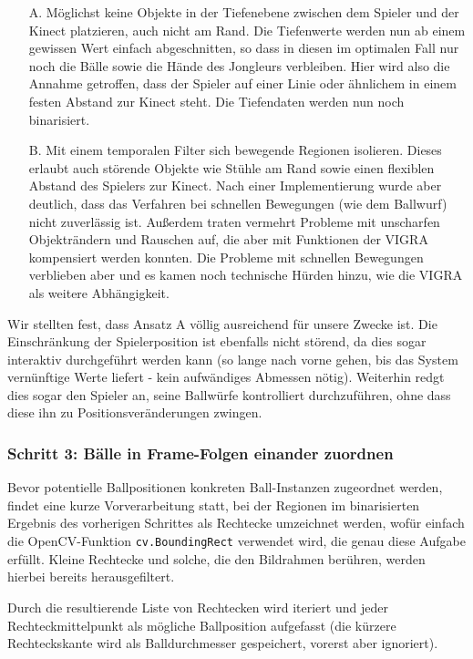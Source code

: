 \documentclass[12pt,a4paper,ngerman]{scrartcl}
\begin{document}
\begin{itemize}
\item[A.]Möglichst keine Objekte in der Tiefenebene zwischen dem Spieler und der Kinect platzieren, auch nicht am Rand. Die Tiefenwerte
werden nun ab einem gewissen Wert einfach abgeschnitten, so dass in diesen im optimalen Fall nur noch die Bälle sowie die Hände des
Jongleurs verbleiben. Hier wird also die Annahme getroffen, dass der Spieler auf einer Linie oder ähnlichem in einem festen Abstand zur
Kinect steht. Die Tiefendaten werden nun noch binarisiert.
\item[B.]Mit einem temporalen Filter sich bewegende Regionen isolieren. Dieses erlaubt auch störende Objekte wie Stühle am Rand sowie
einen flexiblen Abstand des Spielers zur Kinect. Nach einer Implementierung wurde aber deutlich, dass das Verfahren bei schnellen Bewegungen
(wie dem Ballwurf) nicht zuverlässig ist. Außerdem traten vermehrt Probleme mit unscharfen Objekträndern und Rauschen auf, die aber mit Funktionen der VIGRA\cite{vigra} kompensiert werden konnten. Die Probleme mit schnellen Bewegungen verblieben aber und es kamen noch technische Hürden hinzu, wie die VIGRA\cite{vigra} als weitere Abhängigkeit.
\end{itemize}

Wir stellten fest, dass Ansatz A völlig ausreichend für unsere Zwecke ist. Die Einschränkung der Spielerposition ist ebenfalls nicht störend, da dies sogar interaktiv durchgeführt werden kann (so lange nach vorne gehen, bis das System vernünftige Werte liefert - kein aufwändiges Abmessen nötig). Weiterhin redgt dies sogar den Spieler an, seine Ballwürfe kontrolliert durchzuführen, ohne dass diese ihn zu Positionsveränderungen zwingen.

\subsubsection{Schritt 3: Bälle in Frame-Folgen einander zuordnen}
\label{sec:ballzuordnung}

Bevor potentielle Ballpositionen konkreten Ball-Instanzen zugeordnet werden, findet eine kurze Vorverarbeitung statt, bei der Regionen im binarisierten Ergebnis des vorherigen Schrittes als Rechtecke umzeichnet werden, wofür einfach die OpenCV-Funktion \lstinline{cv.BoundingRect} verwendet wird, die genau diese Aufgabe erfüllt.
Kleine Rechtecke und solche, die den Bildrahmen berühren, werden hierbei bereits herausgefiltert.

Durch die resultierende Liste von Rechtecken wird iteriert und jeder
Rechteckmittelpunkt als mögliche Ballposition aufgefasst (die kürzere Rechteckskante
wird als Balldurchmesser gespeichert, vorerst aber ignoriert).
\end{document}
